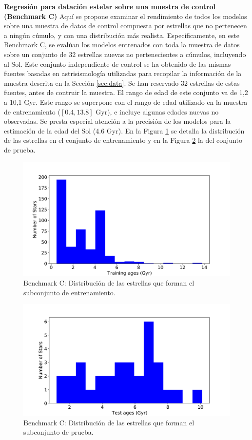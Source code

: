 \textbf{Regresión para datación estelar sobre una muestra de control (Benchmark C)} {} Aquí se propone examinar el rendimiento de todos los modelos sobre una muestra de datos de control compuesta por estrellas que no pertenecen a ningún cúmulo, y con una distribución más realista. Especificamente, en este Benchmark C, se evalúan los modelos entrenados con toda la muestra de datos sobre un conjunto de $32$ estrellas nuevas no pertenecientes a cúmulos, incluyendo al Sol. Este conjunto independiente de control se ha obtenido de las mismas fuentes basadas en astrisismología utilizadas para recopilar la información de la muestra descrita en la Sección \ref{sec:data}. Se han reservado 32 estrellas de estas fuentes, antes de contruir la muestra. El rango de edad de este conjunto va de 1,2 a 10,1 Gyr. Este rango se superpone con el rango de edad utilizado en la muestra de entrenamiento ($[0.4, 13.8]$ Gyr), e incluye algunas edades nuevas no observadas. Se presta especial atención a la precisión de los modelos para la estimación de la edad del Sol (4.6 Gyr). En la Figura \ref{fig:benchC_train} se detalla la distribución de las estrellas en el conjunto de entrenamiento y en la Figura \ref{fig:benchC_test} la del conjunto de prueba.

\begin{figure}[H]
\begin{center}
 \includegraphics[width=0.8\linewidth]{Figuras/Experimentos/B_C_training.pdf}
\end{center}
\caption{Benchmark C: Distribución de las estrellas que forman el subconjunto de entrenamiento.}
 \label{fig:benchC_train}
\end{figure}

\begin{figure}[H]
\begin{center}
 \includegraphics[width=0.8\linewidth]{Figuras/Experimentos/B_C_test.pdf}
\end{center}
\caption{Benchmark C: Distribución de las estrellas que forman el subconjunto de prueba.}
 \label{fig:benchC_test}
\end{figure}


